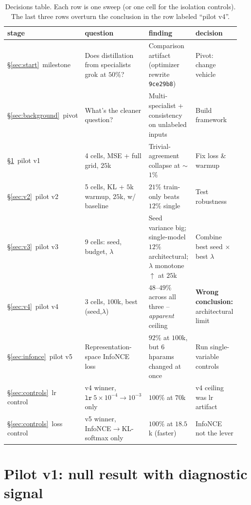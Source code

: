 \documentclass[11pt,a4paper]{article}
\begin{document}
\begin{table}[h]
\centering
\small
\setlength{\tabcolsep}{4pt}
\begin{tabular}{@{}p{0.12\linewidth} p{0.32\linewidth} p{0.29\linewidth} p{0.22\linewidth}@{}}
\toprule
\textbf{stage} & \textbf{question} & \textbf{finding} & \textbf{decision} \\
\midrule
\S\ref{sec:start}\ milestone & Does distillation from specialists grok at $50\%$? & Comparison artifact (optimizer rewrite \texttt{9ce29b8}) & Pivot: change vehicle \\
\S\ref{sec:background}\ pivot & What's the cleaner question? & Multi-specialist + consistency on unlabeled inputs & Build framework \\
\S\ref{sec:v1}\ pilot v1 & 4 cells, MSE + full grid, $25$k & Trivial-agreement collapse at $\sim$$1\%$ & Fix loss \& warmup \\
\S\ref{sec:v2}\ pilot v2 & 5 cells, KL + $5$k warmup, $25$k, w/ baseline & $21\%$ train-only beats $12\%$ single & Test robustness \\
\S\ref{sec:v3}\ pilot v3 & 9 cells: seed, budget, $\lambda$ & Seed variance big; single-model $12\%$ architectural; $\lambda$ monotone $\uparrow$ at $25$k & Combine best seed $\times$ best $\lambda$ \\
\S\ref{sec:v4}\ pilot v4 & 3 cells, $100$k, best (seed,$\lambda$) & $48$--$49\%$ across all three -- \emph{apparent} ceiling & \textbf{Wrong conclusion:} architectural limit \\
\S\ref{sec:infonce}\ pilot v5 & Representation-space InfoNCE loss & $92\%$ at $100$k, but $6$ hparams changed at once & Run single-variable controls \\
\S\ref{sec:controls}\ lr control & v4 winner, $\mathtt{lr}\ 5{\times}10^{-4}\!\to\!10^{-3}$ only & $100\%$ at $70$k & v4 ceiling was lr artifact \\
\S\ref{sec:controls}\ loss control & v5 winner, InfoNCE$\to$KL-softmax only & $100\%$ at $18.5$k (faster) & InfoNCE not the lever \\
\bottomrule
\end{tabular}
\caption{Decisions table. Each row is one sweep (or one cell for the
isolation controls). The last three rows overturn the conclusion in
the row labeled ``pilot v4''.}
\label{tab:decisions}
\end{table}

\section{Pilot v1: null result with diagnostic signal}
\label{sec:v1}
\end{document}
